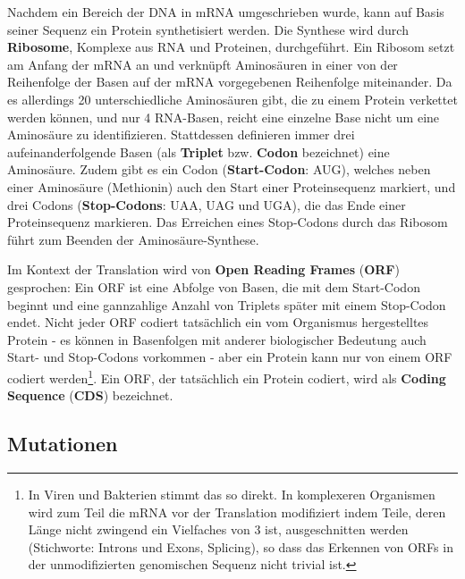 Nachdem ein Bereich der DNA in mRNA umgeschrieben wurde, kann auf Basis seiner Sequenz ein Protein synthetisiert werden. Die Synthese wird durch \textbf{Ribosome}, Komplexe aus RNA und Proteinen, durchgeführt. Ein Ribosom setzt am Anfang der mRNA an und verknüpft Aminosäuren in einer von der Reihenfolge der Basen auf der mRNA vorgegebenen Reihenfolge miteinander. Da es allerdings 20 unterschiedliche Aminosäuren gibt, die zu einem Protein verkettet werden können, und nur 4 RNA-Basen, reicht eine einzelne Base nicht um eine Aminosäure zu identifizieren. Stattdessen definieren immer drei aufeinanderfolgende Basen (als \textbf{Triplet} bzw. \textbf{Codon} bezeichnet) eine Aminosäure. Zudem gibt es ein Codon (\textbf{Start-Codon}: AUG), welches neben einer Aminosäure (Methionin) auch den Start einer Proteinsequenz markiert, und drei Codons (\textbf{Stop-Codons}: UAA, UAG und UGA), die das Ende einer Proteinsequenz markieren. Das Erreichen eines Stop-Codons durch das Ribosom führt zum Beenden der Aminosäure-Synthese. 

Im Kontext der Translation wird von \textbf{Open Reading Frames} (\textbf{ORF}) gesprochen: Ein ORF ist eine Abfolge von Basen, die mit dem Start-Codon beginnt und eine gannzahlige Anzahl von Triplets später mit einem Stop-Codon endet. Nicht jeder ORF codiert tatsächlich ein vom Organismus hergestelltes Protein - es können in Basenfolgen mit anderer biologischer Bedeutung auch Start- und Stop-Codons vorkommen - aber ein Protein kann nur von einem ORF codiert werden\footnote{In Viren und Bakterien stimmt das so direkt. In komplexeren Organismen wird zum Teil die mRNA vor der Translation modifiziert indem Teile, deren Länge nicht zwingend ein Vielfaches von 3 ist, ausgeschnitten werden (Stichworte: Introns und Exons, Splicing), so dass das Erkennen von ORFs in der unmodifizierten genomischen Sequenz nicht trivial ist.}. Ein ORF, der tatsächlich ein Protein codiert, wird als \textbf{Coding Sequence} (\textbf{CDS}) bezeichnet. 

\subsection{Mutationen}

